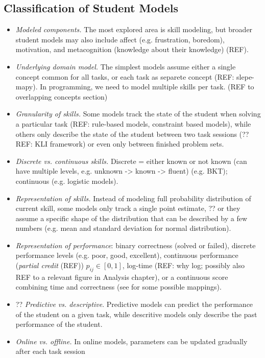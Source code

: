 \subsection{Classification of Student Models}

\begin{itemize}
\item \emph{Modeled components.}
The most explored area is skill modeling, but broader student models may also
include affect (e.g. frustration, boredom), motivation, and metacognition
(knowledge about their knowledge) (REF).
\item \emph{Underlying domain model.}
The simplest models assume either a single concept common for all tasks,
or each task as separete concept (REF: slepe-mapy). In programming,
we need to model multiple skills per task.
(REF to overlapping concepts section)
\item \emph{Granularity of skills.}
Some models track the state of the student when solving a particular task
(REF: rule-based models, constraint based models), while others
only describe the state of the student between two task sessions
(??REF: KLI framework) or even only between finished problem sets.
\item \emph{Discrete vs. continuous skills.}
Discrete = either known or not known (can have multiple levels, e.g.
unknown -> known -> fluent) (e.g. BKT); continuous (e.g. logistic models).
\cite{pelanek-learner-modeling}
\item \emph{Representation of skills.}
Instead of modeling full probability distribution of current skill, some models
only track a single point estimate,
?? or they assume a specific shape of the distribution that can be described by
a few numbers (e.g. mean and standard deviation for normal distribution).
\item \emph{Representation of performance}:
  binary correctness (solved or failed),
  discrete performance levels (e.g. poor, good, excellent),
  continuous performance (\emph{partial credit} (REF)) $p_{ij} \in [0, 1]$,
  log-time (REF: why log; possibly also REF to a relevant figure in Analysis chapter),
  or a continuous score combining time and correctness
  (see \cite[p.106]{rihak-phd} for some possible mappings).
\item ?? \emph{Predictive vs. descriptive}.
Predictive models can predict the performance of the student on a given task,
while descritive models only describe the past performance of the student.
\item \emph{Online vs. offline.}
In online models, parameters can be updated gradually after each task session

\end{itemize}

